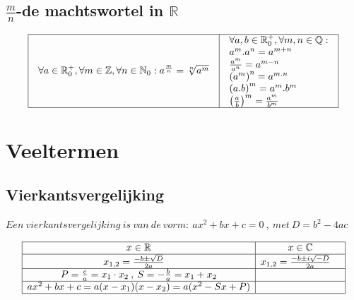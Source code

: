 \documentclass[a5paper]{article}
\begin{document}
\newpage

\subsection{$\frac{m}{n}$-de machtswortel in $\mathbb{R}$ }
\[
\begin{array}{|c|c|}
\hline
\begin{array}{l}
\forall a\in\mathbb{R}_0^+,\forall m\in\mathbb{Z},\forall n\in\mathbb{N}_0:a^\frac{m}{n}=\sqrt[n]{a^m}
\end{array} & \begin{array}{l}
\forall a,b\in\mathbb{R}_0^+,\forall m,n\in\mathbb{Q}:\\
a^m.a^n=a^{m+n}\\
\frac{a^m}{a^n}=a^{m-n}\\
\left(a^m\right)^n=a^{m.n}\\
\left(a.b\right)^m=a^m.b^m\\
\left(\frac{a}{b}\right)^m=\frac{a^m}{b^m}
\end{array} \\ 
\hline
\end{array}
\]

\section{Veeltermen}
\subsection{Vierkantsvergelijking}
$Een\:vierkantsvergelijking\:is\:van\:de\:vorm:\:ax^2 + bx + c = 0\:,\:met\:D=b^2 - 4ac $

\renewcommand{\arraystretch}{1.5} %
\[
\begin{array}{|c|c|}
\hline
x\in{\displaystyle \mathbb {R} } & x\in{\displaystyle \mathbb {C} } \\ 
\hline
x_{1,2} = \frac{-b \pm \sqrt{D}}{2a} \quad  & x_{1,2} = \frac{-b \pm i\sqrt{-D}}{2a} \quad \\ 
\hline
P = \frac{c}{a} = x_1 \cdot x_2\:,\:S = -\frac{b}{a} = x_1 + x_2 &  \\ 
\hline
ax^2 + bx + c = a(x - x_1)(x - x_2) = a(x^2 - Sx + P) & \\
\hline
\end{array}
\]
\end{document}
